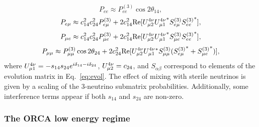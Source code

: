 \begin{equation}
    P_{ee} \approx P_{ee}^{(3)} \cos2\theta_{14},
\end{equation}
\begin{equation}
    P_{e\mu} \approx c_{14}^2c_{24}^2P^{(3)}_{e\mu}+2c_{14}^2\mathrm{Re}[U^{4\nu}_{\mu2}{U^{4\nu}_{\mu1}}^*S^{(3)}_{e\mu}{S^{(3)}_{ee}}^*],
\end{equation}
\begin{equation}
    P_{\mu e} \approx c_{14}^2c_{24}^2P^{(3)}_{\mu e}+2c_{14}^2\mathrm{Re}[U^{4\nu}_{\mu2}{U^{4\nu}_{\mu1}}^*S^{(3)}_{\mu e}{S^{(3)}_{ee}}^*],
\end{equation}
\begin{equation}
    P_{\mu\mu} \approx P_{\mu\mu}^{(3)} \cos2\theta_{24} + 2c_{24}^2\mathrm{Re}[U^{4\nu}_{\mu2}U^{4\nu}_{\mu1}{}^*S^{(3)}_{\mu\mu}({S^{(3)}_{e\mu}}^*+{S^{(3)}_{\mu e}}^*)],
\end{equation}
\noindent where $U^{4\nu}_{\mu1}=-s_{14}s_{24}e^{i\delta_{14}-i\delta_{24}}$, $U^{4\nu}_{\mu2}=c_{24}$, and $S_{\alpha\beta}$ correspond to elements of the evolution matrix in Eq.~\ref{eq:evol}. The effect of mixing with sterile neutrinos is given by a scaling of the 3-neutrino submatrix probabilities. Additionally, some interference terms appear if both $s_{14}$ and $s_{24}$ are non-zero.

\subsubsection{The ORCA low energy regime}

